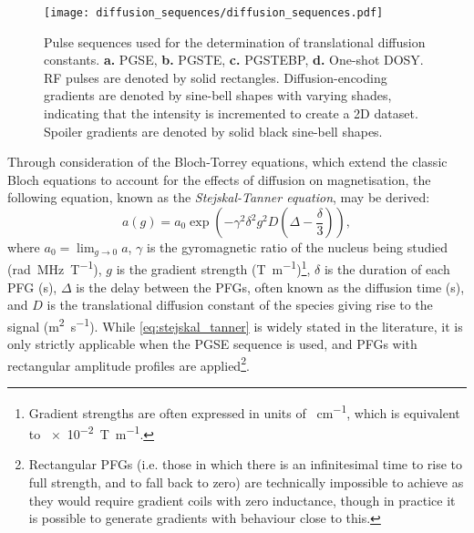 \begin{figure}
   \texttt{[image: diffusion\_sequences/diffusion\_sequences.pdf]}
   \caption[
       Pulse sequences used for the determination of translational diffusion constants.
   ]{
       Pulse sequences used for the determination of translational diffusion constants.
       \textbf{a.} \acs{PGSE},
       \textbf{b.} \acs{PGSTE},
       \textbf{c.} \acs{PGSTEBP},
       \textbf{d.} One-shot DOSY.
       \ac{RF} pulses are denoted by solid rectangles. Diffusion-encoding
       gradients are denoted by sine-bell shapes with varying shades,
       indicating that the intensity is incremented to create a \ac{2D}
       dataset. Spoiler gradients are denoted by solid black sine-bell shapes.
   }
   \label{fig:diffusion_sequences}
\end{figure}

Through consideration of the Bloch-Torrey equations\cite{Torrey1956}, which
extend the classic Bloch equations to account for the effects of diffusion on
magnetisation, the following equation, known as the \emph{Stejskal-Tanner
equation}, may be derived:
\begin{equation}
    a(g) = a_0 \exp \left(- \gamma^2 \delta^2 g^2 D \left(\Delta -
    \frac{\delta}{3}\right)\right),
    \label{eq:stejskal_tanner}
\end{equation}
where
$a_0 = \lim_{g \rightarrow 0} a$,
$\gamma$ is the gyromagnetic ratio of the nucleus being studied
(\unit{\radian \mega\hertz\per\tesla}),
$g$ is the gradient strength (\unit{\tesla\per\meter})\footnote{
    Gradient strengths are often expressed in units of
    \unit{\gauss\per\centi\meter}, which is equivalent to
    \qty[print-unity-mantissa = false]{e-2}{\tesla\per\meter}.
},
$\delta$ is the duration of each \ac{PFG} (\unit{\second}),
$\Delta$ is the delay between the \acp{PFG}, often known as the diffusion time
(\unit{\second}),
and $D$ is the translational diffusion constant of the species giving rise to
the signal (\unit{\meter\squared\per\second}).
While \cref{eq:stejskal_tanner} is widely stated in the literature, it is only
strictly applicable when the \ac{PGSE} sequence is used, and \acp{PFG} with
rectangular amplitude profiles are applied\footnote{
    Rectangular \acp{PFG} (i.e. those in which there is an infinitesimal time
    to rise to full strength, and to fall back to zero) are technically
    impossible to achieve as they would require gradient coils with zero
    inductance, though in practice it is possible to generate gradients with
    behaviour close to this.
}.

